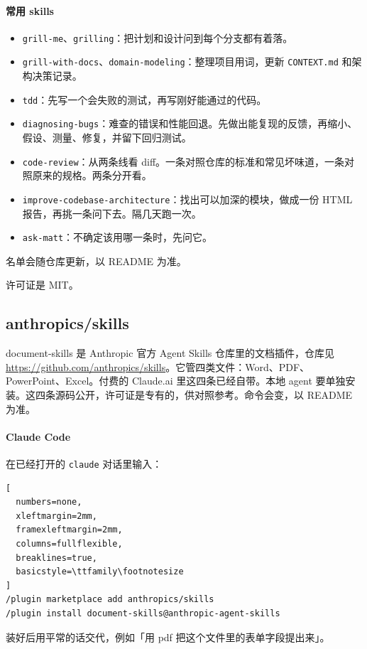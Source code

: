 \paragraph{常用 skills}
\begin{itemize}
\item \verb|grill-me|、\verb|grilling|：把计划和设计问到每个分支都有着落。
\item \verb|grill-with-docs|、\verb|domain-modeling|：整理项目用词，更新 \verb|CONTEXT.md| 和架构决策记录。
\item \verb|tdd|：先写一个会失败的测试，再写刚好能通过的代码。
\item \verb|diagnosing-bugs|：难查的错误和性能回退。先做出能复现的反馈，再缩小、假设、测量、修复，并留下回归测试。
\item \verb|code-review|：从两条线看 diff。一条对照仓库的标准和常见坏味道，一条对照原来的规格。两条分开看。
\item \verb|improve-codebase-architecture|：找出可以加深的模块，做成一份 HTML 报告，再挑一条问下去。隔几天跑一次。
\item \verb|ask-matt|：不确定该用哪一条时，先问它。
\end{itemize}
名单会随仓库更新，以 README 为准。

许可证是 MIT。




\subsection{anthropics/skills}
document-skills 是 Anthropic 官方 Agent Skills 仓库里的文档插件，仓库见 \url{https://github.com/anthropics/skills}。它管四类文件：Word、PDF、PowerPoint、Excel。付费的 Claude.ai 里这四条已经自带。本地 agent 要单独安装。这四条源码公开，许可证是专有的，供对照参考。命令会变，以 README 为准。

\paragraph{Claude Code}
在已经打开的 \verb|claude| 对话里输入：
\begin{lstlisting}[
  numbers=none,
  xleftmargin=2mm,
  framexleftmargin=2mm,
  columns=fullflexible,
  breaklines=true,
  basicstyle=\ttfamily\footnotesize
]
/plugin marketplace add anthropics/skills
/plugin install document-skills@anthropic-agent-skills
\end{lstlisting}
装好后用平常的话交代，例如「用 pdf 把这个文件里的表单字段提出来」。

